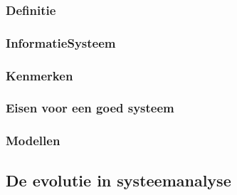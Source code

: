\be
\itf 
\itf 
\itf 
\itf 
\itf 
\itf 
\itf 
\itf 
\itf 
\itf 
\itf 
\itf 
\itf 
\itf 
\itf 
\itf 
\itf 
\itf 
\itf 
\itf 
\itf 
\itf 
\itf 
\itf 
\ee


\subsubsection{Definitie}

\subsubsection{InformatieSysteem}

\subsubsection{Kenmerken}

\subsubsection{Eisen voor een goed systeem}

\subsubsection{Modellen}

\subsection{De evolutie in systeemanalyse}

\subsubsection{}

\subsection{}

\subsection{}

\subsection{}